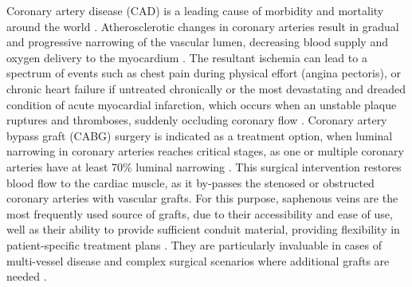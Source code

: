 ﻿\documentclass[12pt,a4paper]{article}
\theoremstyle{definition}
\numberwithin{equation}{section}
\begin{document}
\hspace*{\parindent}  Coronary artery disease (CAD) is a leading cause of morbidity and mortality around the world \cite{25, 34}. Atherosclerotic changes in coronary arteries result in gradual and progressive narrowing of the vascular lumen, decreasing blood supply and oxygen delivery to the myocardium \cite{21}. The resultant ischemia can lead to a spectrum of events such as chest pain during physical effort (angina pectoris), or chronic heart failure if untreated chronically \cite{35} or the most devastating and dreaded condition of acute myocardial infarction, which occurs when an unstable plaque ruptures and thromboses, suddenly occluding coronary flow \cite{1}. Coronary artery bypass graft (CABG) surgery is indicated as a treatment option, when luminal narrowing in coronary arteries reaches critical stages, as one or multiple coronary arteries have at least 70\% luminal narrowing \cite{36}. This surgical intervention restores blood flow to the cardiac muscle, as it by-passes the stenosed or obstructed coronary arteries with vascular grafts. For this purpose, saphenous veins are the most frequently used source of grafts, due to their accessibility and ease of use, well as their ability to provide sufficient conduit material, providing flexibility in patient-specific treatment plans \cite{20, 23}. They are particularly invaluable in cases of multi-vessel disease and complex surgical scenarios where additional grafts are needed \cite{2, 3, 4, 22}.
\end{document}
